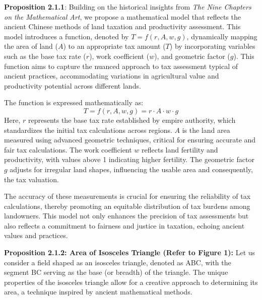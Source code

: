 \documentclass[10pt]{article}
\begin{document}
\vspace{10pt}

\textbf{Proposition 2.1.1}: Building on the historical insights from \textit{The Nine Chapters on the Mathematical Art}, we propose a mathematical model that reflects the ancient Chinese methods of land taxation and productivity assessment. This model introduces a function, denoted by \( T = f(r, A, w, g) \), dynamically mapping the area of land (\( A \)) to an appropriate tax amount (\( T \)) by incorporating variables such as the base tax rate (\( r \)), work coefficient (\( w \)), and geometric factor (\( g \)). This function aims to capture the nuanced approach to tax assessment typical of ancient practices, accommodating variations in agricultural value and productivity potential across different lands.

\vspace{7pt}

The function is expressed mathematically as:
\[ T = f(r, A, w, g) = r \cdot A \cdot w \cdot g \]
Here, \( r \) represents the base tax rate established by empire authority, which standardizes the initial tax calculations across regions. \( A \) is the land area measured using advanced geometric techniques, critical for ensuring accurate and fair tax calculations. The work coefficient \( w \) reflects land fertility and productivity, with values above 1 indicating higher fertility. The geometric factor \( g \) adjusts for irregular land shapes, influencing the usable area and consequently, the tax valuation.

\vspace{7pt}

The accuracy of these measurements is crucial for ensuring the reliability of tax calculations, thereby promoting an equitable distribution of tax burdens among landowners. This model not only enhances the precision of tax assessments but also reflects a commitment to fairness and justice in taxation, echoing ancient values and practices.

\vspace{15pt}

\textbf{Proposition 2.1.2: Area of Isosceles Triangle (Refer to Figure 1):} 
Let us consider a field shaped as an isosceles triangle, denoted as ABC, with the segment BC serving as the base (or breadth) of the triangle. The unique properties of the isosceles triangle allow for a creative approach to determining its area, a technique inspired by ancient mathematical methods.


\vspace{7pt}
\end{document}
